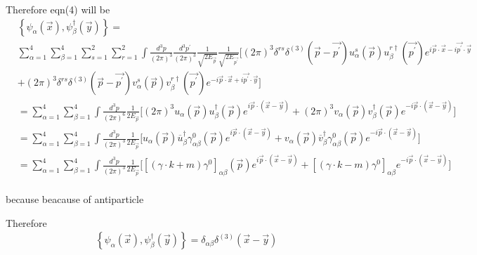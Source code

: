 \documentclass[12pt, letterpaper]{article}
\newcommand*{\1}{\hspace{1pt}}
\begin{document}
Therefore eqn(4) will be 
\begin{align*}
    &\left\{ \psi _{\alpha} (\overrightarrow{x}) , \psi ^{\dagger} _{\beta }(\overrightarrow{y})  \right\} =  \\
    & \sum_{\alpha = 1}^{4}\sum_{\beta = 1}^{4} \sum_{s = 1}^{2} \sum_{r = 1}^{2} \int \frac{d ^{3} p}{(2 \pi) ^{3}}\frac{d ^{3} p ^{\prime}}{(2 \pi) ^{3}} \frac{1}{\sqrt{2 E _{\overrightarrow{p}}}} \frac{1}{\sqrt{2 E _{\overrightarrow{p^{\prime}}}}}\bigg[ (2 \pi) ^{3} \delta ^{rs} \delta ^{(3)}(\overrightarrow{p} - \overrightarrow{p ^{\prime}}) u^{s} _{\alpha}(\overrightarrow{p})u^{r \dagger} _{\beta}(\overrightarrow{p ^{\prime}})e ^{i \overrightarrow{p} \cdot \overrightarrow{x} -i \overrightarrow{p^{\prime}} \cdot \overrightarrow{y}} \\
    & + (2 \pi) ^{3} \delta ^{rs} \delta ^{(3)}(\overrightarrow{p} - \overrightarrow{p ^{\prime}}) v^{s} _{\alpha}(\overrightarrow{p})v^{r \dagger} _{\beta}(\overrightarrow{p ^{\prime}})e ^{-i \overrightarrow{p} \cdot \overrightarrow{x} +i \overrightarrow{p^{\prime}} \cdot \overrightarrow{y}} \bigg] \\
    &= \sum_{\alpha = 1}^{4}\sum_{\beta = 1}^{4} \int \frac{d ^{3} p}{(2 \pi) ^{6}} \frac{1}{{2 E _{\overrightarrow{p}}}} \bigg[ (2 \pi) ^{3} u _{\alpha}(\overrightarrow{p})u^{\dagger} _{\beta}(\overrightarrow{p})e ^{i \overrightarrow{p} \cdot (\overrightarrow{x} - \overrightarrow{y})} + (2 \pi) ^{3} v _{\alpha}(\overrightarrow{p})v^{\dagger} _{\beta}(\overrightarrow{p})e ^{-i \overrightarrow{p} \cdot (\overrightarrow{x} - \overrightarrow{y})} \bigg] \\
    &= \sum_{\alpha = 1}^{4}\sum_{\beta = 1}^{4} \int \frac{d ^{3} p}{(2 \pi) ^{3}} \frac{1}{{2 E _{\overrightarrow{p}}}} \bigg[ u _{\alpha}(\overrightarrow{p})\overline{u}^{\dagger} _{\beta} \gamma ^{0} _{\alpha \beta}(\overrightarrow{p})e ^{i \overrightarrow{p} \cdot (\overrightarrow{x} - \overrightarrow{y})} +  v _{\alpha}(\overrightarrow{p})\overline{v}^{\dagger} _{\beta} \gamma ^{0} _{\alpha \beta}(\overrightarrow{p})e ^{-i \overrightarrow{p} \cdot (\overrightarrow{x} - \overrightarrow{y})} \bigg] \\
    &= \sum_{\alpha = 1}^{4}\sum_{\beta = 1}^{4} \int \frac{d ^{3} p}{(2 \pi) ^{3}} \frac{1}{{2 E _{\overrightarrow{p}}}} \bigg[ [(\gamma \cdot k + m)\gamma ^{0} ]_{\alpha \beta}(\overrightarrow{p})e ^{i \overrightarrow{p} \cdot (\overrightarrow{x} - \overrightarrow{y})} + [(\gamma \cdot k - m)\gamma ^{0} ]_{\alpha \beta} e ^{-i \overrightarrow{p} \cdot (\overrightarrow{x} - \overrightarrow{y})} \bigg] \\
\end{align*}

because
beacause of antiparticle

Therefore 
\begin{align*}
    &\left\{ \psi _{\alpha} (\overrightarrow{x}) , \psi ^{\dagger} _{\beta }(\overrightarrow{y})  \right\} =  \delta _{\alpha \beta} \delta ^{(3)} (\overrightarrow{x} - \overrightarrow{y})
\end{align*}
\end{document}

